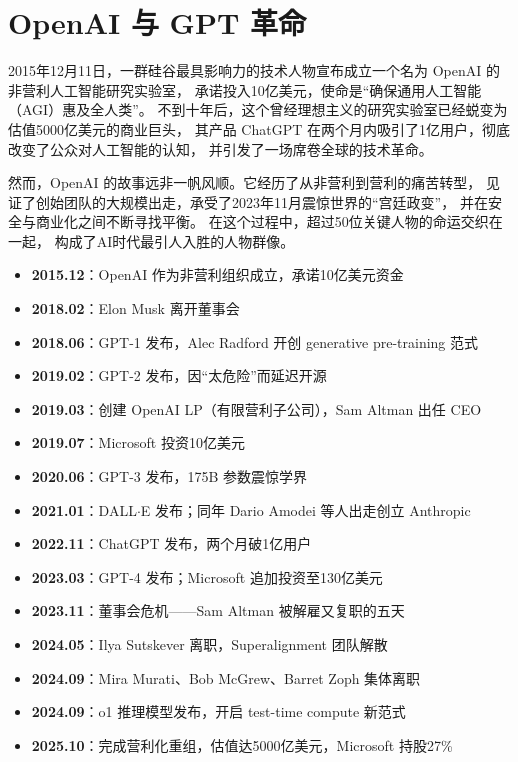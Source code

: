 
\chapter{OpenAI 与 GPT 革命}
\label{ch:openai}

2015年12月11日，一群硅谷最具影响力的技术人物宣布成立一个名为 OpenAI 的非营利人工智能研究实验室，
承诺投入10亿美元，使命是``确保通用人工智能（AGI）惠及全人类''。
不到十年后，这个曾经理想主义的研究实验室已经蜕变为估值5000亿美元的商业巨头，
其产品 ChatGPT 在两个月内吸引了1亿用户，彻底改变了公众对人工智能的认知，
并引发了一场席卷全球的技术革命。

然而，OpenAI 的故事远非一帆风顺。它经历了从非营利到营利的痛苦转型，
见证了创始团队的大规模出走，承受了2023年11月震惊世界的``宫廷政变''，
并在安全与商业化之间不断寻找平衡。
在这个过程中，超过50位关键人物的命运交织在一起，
构成了AI时代最引人入胜的人物群像。

\begin{corebox}
\begin{itemize}[noitemsep]
  \item \textbf{2015.12}：OpenAI 作为非营利组织成立，承诺10亿美元资金
  \item \textbf{2018.02}：Elon Musk 离开董事会
  \item \textbf{2018.06}：GPT-1 发布，Alec Radford 开创 generative pre-training 范式
  \item \textbf{2019.02}：GPT-2 发布，因``太危险''而延迟开源
  \item \textbf{2019.03}：创建 OpenAI LP（有限营利子公司），Sam Altman 出任 CEO
  \item \textbf{2019.07}：Microsoft 投资10亿美元
  \item \textbf{2020.06}：GPT-3 发布，175B 参数震惊学界
  \item \textbf{2021.01}：DALL$\cdot$E 发布；同年 Dario Amodei 等人出走创立 Anthropic
  \item \textbf{2022.11}：ChatGPT 发布，两个月破1亿用户
  \item \textbf{2023.03}：GPT-4 发布；Microsoft 追加投资至130亿美元
  \item \textbf{2023.11}：董事会危机——Sam Altman 被解雇又复职的五天
  \item \textbf{2024.05}：Ilya Sutskever 离职，Superalignment 团队解散
  \item \textbf{2024.09}：Mira Murati、Bob McGrew、Barret Zoph 集体离职
  \item \textbf{2024.09}：o1 推理模型发布，开启 test-time compute 新范式
  \item \textbf{2025.10}：完成营利化重组，估值达5000亿美元，Microsoft 持股27\%
\end{itemize}
\end{corebox}


